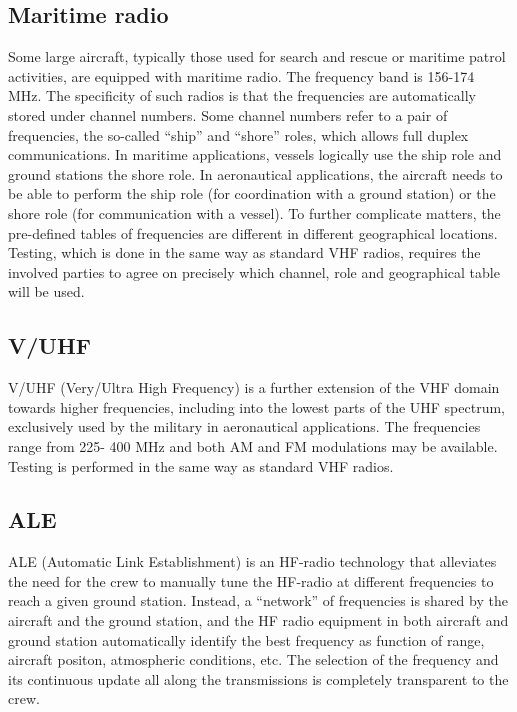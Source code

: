 \documentclass[
]{book}
\begin{document}
\hypertarget{maritime-radio}{%
\subsection{Maritime radio}\label{maritime-radio}}

Some large aircraft, typically those used for search and rescue or maritime
patrol activities, are equipped with maritime radio. The frequency band is
156-174 MHz. The specificity of such radios is that the frequencies are
automatically stored under channel numbers. Some channel numbers refer to a
pair of frequencies, the so-called ``ship'' and ``shore'' roles, which allows full
duplex communications. In maritime applications, vessels logically use the ship
role and ground stations the shore role. In aeronautical applications, the
aircraft needs to be able to perform the ship role (for coordination with a
ground station) or the shore role (for communication with a vessel). To further
complicate matters, the pre-defined tables of frequencies are different in
different geographical locations. Testing, which is done in the same way as
standard VHF radios, requires the involved parties to agree on precisely which
channel, role and geographical table will be used.

\hypertarget{vuhf}{%
\subsection{V/UHF}\label{vuhf}}

V/UHF (Very/Ultra High Frequency) is a further extension of the VHF domain
towards higher frequencies, including into the lowest parts of the UHF
spectrum, exclusively used by the military in aeronautical applications. The
frequencies range from 225- 400 MHz and both AM and FM modulations may be
available. Testing is performed in the same way as standard VHF radios.

\hypertarget{ale}{%
\subsection{ALE}\label{ale}}

ALE (Automatic Link Establishment) is an HF-radio technology that alleviates
the need for the crew to manually tune the HF-radio at different frequencies to
reach a given ground station. Instead, a ``network'' of frequencies is shared by
the aircraft and the ground station, and the HF radio equipment in both
aircraft and ground station automatically identify the best frequency as
function of range, aircraft positon, atmospheric conditions, etc. The selection
of the frequency and its continuous update all along the transmissions is
completely transparent to the crew.
\end{document}
